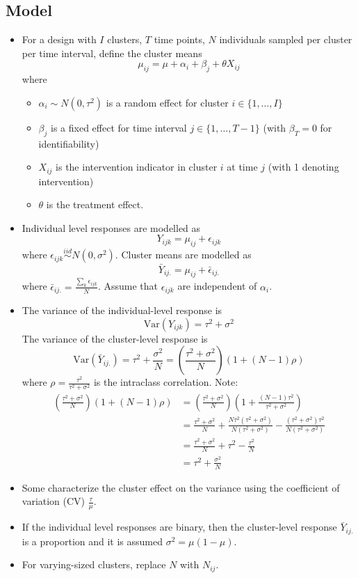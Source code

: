 \documentclass{article}
\newcommand{\Var}{\mathrm{Var}}
\begin{document}
\subsection{Model}

\begin{itemize}

\item
For a design with $I$ clusters, $T$ time points, $N$ individuals sampled per cluster per time interval, define the cluster means
\[
\mu_{ij} = \mu + \alpha_i + \beta_j + \theta X_{ij}
\]
where
\begin{itemize}
\item
$\alpha_i\sim N(0,\tau^2)$ is a random effect for cluster $i\in \{1,\ldots,I\}$
\item
$\beta_j$ is a fixed effect for time interval $j\in \{1,\ldots,T-1\}$ (with $\beta_T=0$ for identifiability)
\item
$X_{ij}$ is the intervention indicator in cluster $i$ at time $j$ (with 1 denoting intervention)
\item
$\theta$ is the treatment effect.
\end{itemize}

\item
Individual level responses are modelled as
\[
Y_{ijk} = \mu_{ij} + \epsilon_{ijk}
\]
where $\epsilon_{ijk}\overset{iid}{\sim} N(0,\sigma^2)$. Cluster means are modelled as
\[
\bar{Y}_{ij.} = \mu_{ij} + \bar{\epsilon}_{ij.}
\]
where $\bar{\epsilon}_{ij.} = \frac{\sum_k\epsilon_{ijk}}{N}$. Assume that $\epsilon_{ijk}$ are independent of $\alpha_i$.

\item
The variance of the individual-level response is
\[
\Var(Y_{ijk}) = \tau^2 + \sigma^2
\]
The variance of the cluster-level response is
\[
\Var(\bar{Y}_{ij.}) = \tau^2 + \frac{\sigma^2}{N} = \left(\frac{\tau^2+\sigma^2}{N}\right)(1+(N-1)\rho)
\]
where $\rho=\frac{\tau^2}{\tau^2+\sigma^2}$ is the intraclass correlation. Note:
\begin{align*}
\left(\frac{\tau^2+\sigma^2}{N}\right)(1+(N-1)\rho) &= \left(\frac{\tau^2+\sigma^2}{N}\right)\left(1+\frac{(N-1)\tau^2}{\tau^2+\sigma^2}\right) \\
&= \frac{\tau^2+\sigma^2}{N} + \frac{N\tau^2(\tau^2+\sigma^2)}{N(\tau^2+\sigma^2)} - \frac{(\tau^2+\sigma^2)\tau^2}{N(\tau^2+\sigma^2)} \\
&=  \frac{\tau^2+\sigma^2}{N} + \tau^2 - \frac{\tau^2}{N} \\
&= \tau^2 + \frac{\sigma^2}{N}
\end{align*}

\item
Some characterize the cluster effect on the variance using the coefficient of variation (CV) $\frac{\tau}{\mu}$.

\item
If the individual level responses are binary, then the cluster-level response $\bar{Y}_{ij.}$ is a proportion and it is assumed $\sigma^2=\mu(1-\mu)$.

\item
For varying-sized clusters, replace $N$ with $N_{ij}$.

\end{itemize}
\end{document}
